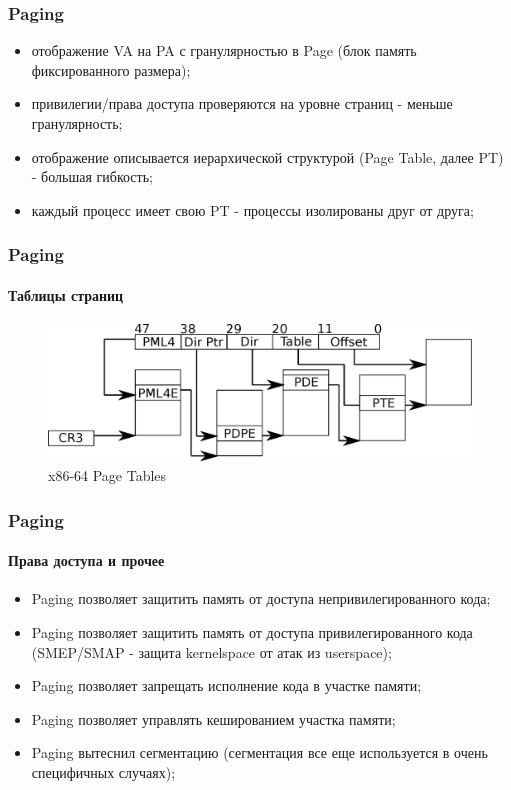 \begin{frame}
\frametitle{Paging}

\begin{itemize}
  \item отображение VA на PA с гранулярностью в Page (блок память фиксированного размера);
  \item привилегии/права доступа проверяются на уровне страниц - меньше гранулярность;
  \item отображение описывается иерархической структурой (Page Table, далее PT) - большая гибкость;
  \item каждый процесс имеет свою PT - процессы изолированы друг от друга;
\end{itemize}
\end{frame}

\begin{frame}
\frametitle{Paging}
\framesubtitle{Таблицы страниц}

\begin{figure}
  \centering\includegraphics[width=.9\linewidth]{arch-page}
  \caption{x86-64 Page Tables}
\end{figure}
\end{frame}

\begin{frame}
\frametitle{Paging}
\framesubtitle{Права доступа и прочее}

\begin{itemize}
  \item Paging позволяет защитить память от доступа непривилегированного кода;
  \item Paging позволяет защитить память от доступа привилегированного кода (SMEP/SMAP - защита kernelspace от атак из userspace);
  \item Paging позволяет запрещать исполнение кода в участке памяти;
  \item Paging позволяет управлять кешированием участка памяти;
  \item Paging вытеснил сегментацию (сегментация все еще используется в очень специфичных случаях);
\end{itemize}
\end{frame}

